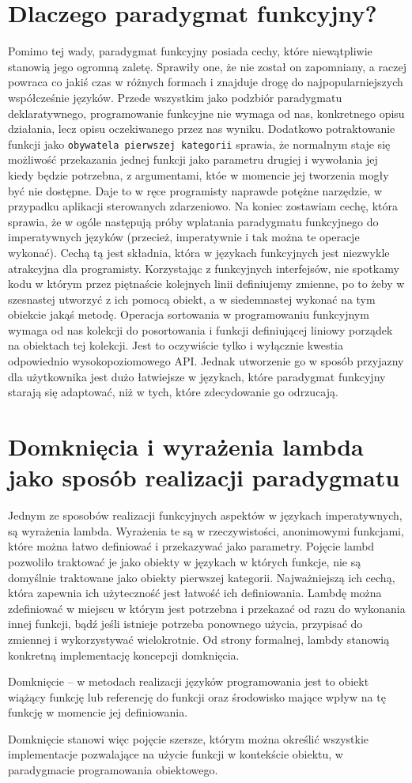 \documentclass[a4paper,10pt]{report}
\begin{document}
\section{Dlaczego paradygmat funkcyjny?}
Pomimo tej wady, paradygmat funkcyjny posiada cechy, które niewątpliwie stanowią jego ogromną zaletę. Sprawiły one, że nie został on zapomniany, a raczej powraca co jakiś czas w różnych formach i znajduje drogę do najpopularniejszych współcześnie języków. Przede wszystkim jako podzbiór paradygmatu deklaratywnego, programowanie funkcyjne nie wymaga od nas, konkretnego opisu działania, lecz opisu oczekiwanego przez nas wyniku. Dodatkowo potraktowanie funkcji jako \verb|obywatela pierwszej kategorii| sprawia, że normalnym staje się możliwość przekazania jednej funkcji jako parametru drugiej i wywołania jej kiedy będzie potrzebna, z argumentami, któe w momencie jej tworzenia mogły być nie dostępne. Daje to w ręce programisty naprawde potężne narzędzie, w przypadku aplikacji sterowanych zdarzeniowo. Na koniec zostawiam cechę, która sprawia, że w ogóle następują próby wplatania paradygmatu funkcyjnego do imperatywnych języków (przecież, imperatywnie i tak można te operacje wykonać). Cechą tą jest składnia, która w językach funkcyjnych jest niezwykle atrakcyjna dla programisty. Korzystając z funkcyjnych interfejsów, nie spotkamy kodu w którym przez piętnaście kolejnych linii definiujemy zmienne, po to żeby w szesnastej utworzyć z ich pomocą obiekt, a w siedemnastej wykonać na tym obiekcie jakąś metodę. Operacja sortowania w programowaniu funkcyjnym wymaga od nas kolekcji do posortowania i funkcji definiującej liniowy porządek na obiektach tej kolekcji. Jest to oczywiście tylko i wyłącznie kwestia odpowiednio wysokopoziomowego API. Jednak utworzenie go w sposób przyjazny dla użytkownika jest dużo łatwiejsze w językach, które paradygmat funkcyjny starają się adaptować, niż w tych, które zdecydowanie go odrzucają.
\section{Domknięcia i wyrażenia lambda jako sposób realizacji paradygmatu}
Jednym ze sposobów realizacji funkcyjnych aspektów w językach imperatywnych, są wyrażenia lambda. Wyrażenia te są w rzeczywistości, anonimowymi funkcjami, które można łatwo definiować i przekazywać jako parametry. Pojęcie lambd pozwoliło traktować je jako obiekty w językach w których funkcje, nie są domyślnie traktowane jako obiekty pierwszej kategorii. Najważniejszą ich cechą, która zapewnia ich użyteczność jest łatwość ich definiowania. Lambdę można zdefiniować w miejscu w którym jest potrzebna i przekazać od razu do wykonania innej funkcji, bądź jeśli istnieje potrzeba ponownego użycia, przypisać do zmiennej i wykorzystywać wielokrotnie. Od strony formalnej, lambdy stanowią konkretną implementację koncepcji domknięcia.
\begin{theo}
Domknięcie – w metodach realizacji języków programowania jest to obiekt wiążący funkcję lub referencję do funkcji oraz środowisko mające wpływ na tę funkcję w momencie jej definiowania.
\end{theo}
Domknięcie stanowi więc pojęcie szersze, którym można określić wszystkie implementacje pozwalające na użycie funkcji w kontekście obiektu, w paradygmacie programowania obiektowego.
\end{document}
